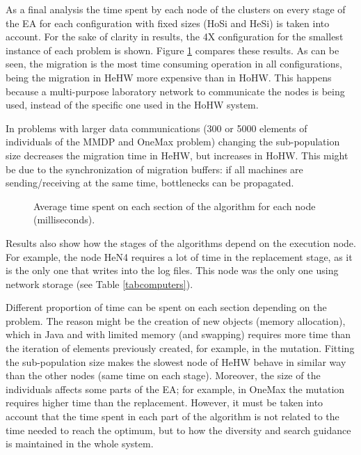 \documentclass[final,1p,times]{elsarticle}
\begin{document}
As a final analysis the time spent by each node of the clusters on
every stage of the EA for each configuration with fixed sizes (HoSi
and HeSi) is taken into account. For the sake of clarity in results, 
 the 4X configuration for the smallest instance of each problem is shown. Figure \ref{fig:bars} compares these results. As can be seen, the migration is the most time consuming operation in all configurations, being the migration in HeHW more expensive than in HoHW. This happens because a multi-purpose laboratory network to communicate
the nodes is being used, instead of the specific one used in the HoHW
system. 

 In problems with larger data communications (300 or 5000 elements of individuals of the MMDP and OneMax problem) changing the sub-population size decreases the migration time in HeHW, but increases in HoHW. This might be due to the synchronization of migration buffers: if all machines are sending/receiving at the same time, bottlenecks can be propagated.

\begin{figure}[ht]
\centering
{}
\caption{Average time spent on each section of the algorithm for each node (milliseconds).}
\label{fig:bars}
\end{figure}



Results also show how the stages of the algorithms depend on the execution
node. For example, the node HeN4 requires a lot of time in the replacement stage,
 as it is the only one that writes into the log files. This node was the only one
  using network storage (see Table \ref{tabcomputers}).

Different proportion of time can be spent on each section depending on the problem.
The reason might be the
creation of new objects (memory allocation), which in Java and with
limited memory (and swapping) requires more time than the iteration of
elements previously created, for example, in the mutation. Fitting
the sub-population size makes the slowest node of HeHW behave in similar
way than the other nodes (same time on each stage). Moreover, the size
of the individuals affects some parts of the EA; for example, in 
OneMax the mutation requires higher time than the replacement. However,
it must be taken into account that the time spent in each part of the
algorithm is not related to the time needed to reach the optimum, but to
how the diversity and search guidance is maintained in the whole
system.  
\end{document}
